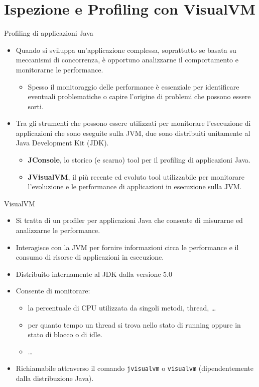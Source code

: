 \documentclass[presentation]{beamer}
\begin{document}
\section{Ispezione e Profiling con VisualVM}

\begin{frame}{Profiling di applicazioni Java}
\begin{itemize}\itemsep10pt
\item Quando si sviluppa un'applicazione complessa, soprattutto se basata su meccanismi di concorrenza, è opportuno analizzarne il comportamento e monitorarne le performance.
\begin{itemize}
\item Spesso il monitoraggio delle performance è essenziale per identificare eventuali problematiche o capire l'origine di problemi che possono essere sorti.
\end{itemize}
\item Tra gli strumenti che possono essere utilizzati per monitorare l'esecuzione di applicazioni che sono eseguite sulla JVM, due sono distribuiti unitamente al Java Development Kit (JDK).
\begin{itemize}
\item \textbf{JConsole}, lo storico (e scarno) tool per il profiling di applicazioni Java.
\item \textbf{JVisualVM}, il più recente ed evoluto tool utilizzabile per monitorare l'evoluzione e le performance di applicazioni in esecuzione sulla JVM.
\end{itemize}
\end{itemize}
\end{frame}

\begin{frame}{VisualVM}
\begin{itemize}\itemsep10pt
\item Si tratta di un profiler per applicazioni Java che consente di misurarne ed analizzarne le performance.
\item Interagisce con la JVM per fornire informazioni circa le performance e il consumo di risorse di applicazioni in esecuzione.
\item Distribuito internamente al JDK dalla versione 5.0
\item Consente di monitorare:
\begin{itemize}
\item la percentuale di CPU utilizzata da singoli metodi, thread, \dots
\item per quanto tempo un thread si trova nello stato di running oppure in stato di blocco o di idle.
\item \dots
\end{itemize}
\item Richiamabile attraverso il comando \texttt{jvisualvm} o \texttt{visualvm} (dipendentemente dalla distribuzione Java).
\end{itemize}
\end{frame}
\end{document}
